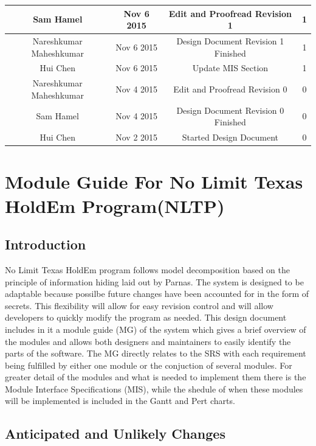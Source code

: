 \documentclass[11pt]{article}
\begin{document}
\begin{table}[H]
\begin{center}
\begin{tabular}{|| c c c c ||}
	\hline
     Sam Hamel & Nov 6 2015 & Edit and Proofread Revision 1 & 1\\
     \hline
    Nareshkumar Maheshkumar & Nov 6 2015 & Design Document Revision 1 Finished & 1\\
    \hline
    Hui Chen & Nov 6 2015 & Update MIS Section & 1\\  
    \hline
    Nareshkumar Maheshkumar & Nov 4 2015 & Edit and Proofread Revision 0 & 0\\
    \hline
   Sam Hamel & Nov 4 2015 & Design Document Revision 0 Finished & 0\\
   \hline
   Hui Chen & Nov 2 2015 & Started Design Document & 0\\
	\end{tabular}
	\end{center}
    \end{table}
    \newpage
    
    \tableofcontents
    \listoffigures
    \listoftables
    
    \newpage
    \section{Module Guide For No Limit Texas HoldEm Program(NLTP)}
    \subsection{Introduction}
    No Limit Texas HoldEm program follows model decomposition based on the principle of information hiding laid out by Parnas. The system is designed to be adaptable because possilbe future changes have been accounted for in the form of secrets. This flexibility will allow for easy revision control and will allow developers to quickly modify the program as needed. This design document includes in it a module guide (MG) of the system which gives a brief overview of the modules and allows both designers and maintainers to easily identify the parts of the software. The MG directly relates to the SRS with each requirement being fulfilled by either one module or the conjuction of several modules. For greater detail of the modules and what is needed to implement them there is the Module Interface Specifications (MIS), while the shedule of when these modules will be implemented is included in the Gantt and Pert charts.
    \subsection{Anticipated and Unlikely Changes}
\end{document}
